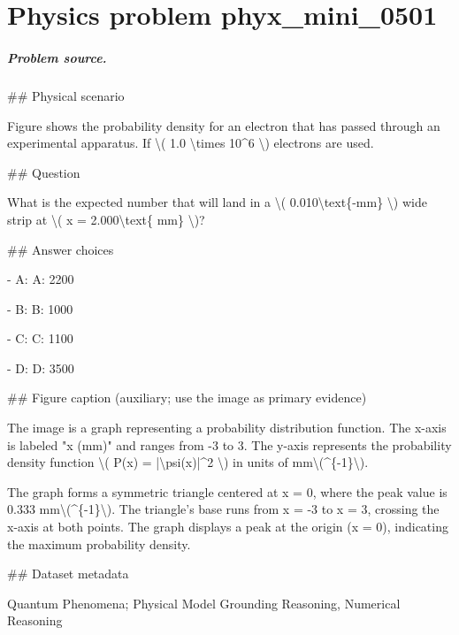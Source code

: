
\chapter{Physics problem phyx\_mini\_0501}
\label{ch:PhyXMiniProblems_problem_phyx_mini_0501}

\paragraph{Problem source.}
\#\# Physical scenario

Figure shows the probability density for an electron that has passed through an experimental apparatus. If \textbackslash{}( 1.0 \textbackslash{}times 10\textasciicircum{}6 \textbackslash{}) electrons are used.

\#\# Question

What is the expected number that will land in a \textbackslash{}( 0.010\textbackslash{}text\{-mm\} \textbackslash{}) wide strip at \textbackslash{}( x = 2.000\textbackslash{}text\{ mm\} \textbackslash{})?

\#\# Answer choices

- A: A: 2200

- B: B: 1000

- C: C: 1100

- D: D: 3500

\#\# Figure caption (auxiliary; use the image as primary evidence)

The image is a graph representing a probability distribution function. The x-axis is labeled "x (mm)" and ranges from -3 to 3. The y-axis represents the probability density function \textbackslash{}( P(x) = |\textbackslash{}psi(x)|\textasciicircum{}2 \textbackslash{}) in units of mm\textbackslash{}(\textasciicircum{}\{-1\}\textbackslash{}).

The graph forms a symmetric triangle centered at x = 0, where the peak value is 0.333 mm\textbackslash{}(\textasciicircum{}\{-1\}\textbackslash{}). The triangle's base runs from x = -3 to x = 3, crossing the x-axis at both points. The graph displays a peak at the origin (x = 0), indicating the maximum probability density.

\#\# Dataset metadata

Quantum Phenomena; Physical Model Grounding Reasoning, Numerical Reasoning

